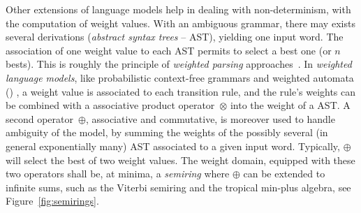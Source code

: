 Other extensions of language models  %
help in dealing with non-determinism, with the computation of weight values. 
With an ambiguous grammar, there may exists several derivations 
(\emph{abstract syntax trees} -- AST), %
yielding one input word. %
The association of one weight value %
to each AST permits to select a best one (or $n$ bests). %
This is roughly the principle of \emph{weighted parsing}
approaches~\cite{Goodman99SemiringParsing,Nederhof03weightedParsing,MorbitzVogler19weighted-parsing}.
In \emph{weighted language models}, 
like \eg probabilistic context-free grammars %
and weighted automata (\WA) \cite{Droste09handbook},
a weight value is associated to each transition rule, %
and the rule's weights can be combined with a associative product operator~$\otimes$ into 
the weight of a AST.
A second operator~$\oplus$, associative and commutative, 
is moreover used to handle ambiguity of the model, 
by summing the weights of the possibly several (in general exponentially many) AST %
associated to a given input word.
Typically, $\oplus$ will select the best of two weight values.
The weight domain, equipped with these two operators shall be, at minima, 
a \emph{semiring} %
where $\oplus$ can be extended to infinite sums, 
such as the Viterbi semiring and the tropical min-plus algebra, see Figure~\ref{fig:semirings}. 

